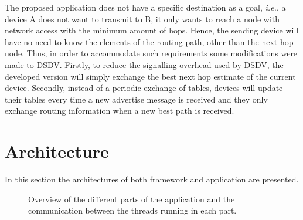 The proposed application does not have a specific destination as a goal, \textit{i.e.}, a device A does not want to transmit to B, it only wants to reach a node with network access with the minimum amount of hops. Hence, the sending device will have no need to know the elements of the routing path, other than the next hop node. Thus, in order to accommodate such requirements some modifications were made to \gls{DSDV}. Firstly, to reduce the signalling overhead used by \gls{DSDV}, the developed version will simply exchange the best next hop estimate of the current device. Secondly, instead of a periodic exchange of tables, devices will update their tables every time a new advertise message is received and they only exchange routing information when a new best path is received.

\section{Architecture}
\label{sec:architecture}

In this section the architectures of both framework and application are presented.

\begin{figure}[ht]
	\noindent{}
	\caption{\label{fig:appsandbox} Overview of the different parts of the application and the communication between the threads running in each part.}
\end{figure}

